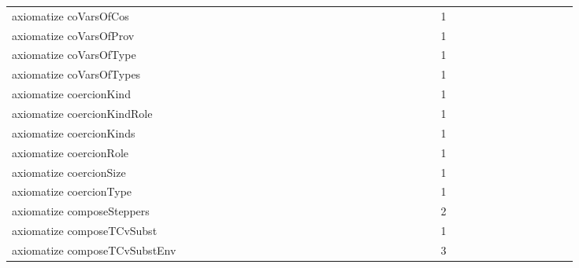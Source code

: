 {\begin{tabular}{l|rrr|rrr|rrr}
axiomatize coVarsOfCos &  &  &  &  &  &  &  &  &  &  &  &  &  &  &  &  &  &  &  &  &  &  &  & 1 &  &  &  &  &  &  &  &  &  &  &  & \\
axiomatize coVarsOfProv &  &  &  &  &  &  &  &  &  &  &  &  &  &  &  &  &  &  &  &  &  &  &  & 1 &  &  &  &  &  &  &  &  &  &  &  & \\
axiomatize coVarsOfType &  &  &  &  &  &  &  &  &  &  &  &  &  &  &  &  &  &  &  &  &  &  &  & 1 &  &  &  &  &  &  &  &  &  &  &  & \\
axiomatize coVarsOfTypes &  &  &  &  &  &  &  &  &  &  &  &  &  &  &  &  &  &  &  &  &  &  &  & 1 &  &  &  &  &  &  &  &  &  &  &  & \\
axiomatize coercionKind &  &  &  &  &  &  &  &  &  &  &  &  &  &  &  &  &  &  &  &  &  &  &  & 1 &  &  &  &  &  &  &  &  &  &  &  & \\
axiomatize coercionKindRole &  &  &  &  &  &  &  &  &  &  &  &  &  &  &  &  &  &  &  &  &  &  &  & 1 &  &  &  &  &  &  &  &  &  &  &  & \\
axiomatize coercionKinds &  &  &  &  &  &  &  &  &  &  &  &  &  &  &  &  &  &  &  &  &  &  &  & 1 &  &  &  &  &  &  &  &  &  &  &  & \\
axiomatize coercionRole &  &  &  &  &  &  &  &  &  &  &  &  &  &  &  &  &  &  &  &  &  &  &  & 1 &  &  &  &  &  &  &  &  &  &  &  & \\
axiomatize coercionSize &  &  &  &  &  &  &  &  &  &  &  &  &  &  &  &  &  &  &  &  &  &  &  & 1 &  &  &  &  &  &  &  &  &  &  &  & \\
axiomatize coercionType &  &  &  &  &  &  &  &  &  &  &  &  &  &  &  &  &  &  &  &  &  &  &  & 1 &  &  &  &  &  &  &  &  &  &  &  & \\
axiomatize composeSteppers &  &  &  &  &  &  &  &  &  &  &  &  &  &  &  &  &  &  &  &  &  &  &  & 2 &  &  &  &  &  &  &  &  &  &  &  & \\
axiomatize composeTCvSubst &  &  &  &  &  &  &  &  &  &  &  &  &  &  &  &  &  &  &  &  &  &  &  & 1 &  &  &  &  &  &  &  &  &  &  &  & \\
axiomatize composeTCvSubstEnv &  &  &  &  &  &  &  &  &  &  &  &  &  &  &  &  &  &  &  &  &  &  &  & 3 &  &  &  &  &  &  &  &  &  &  &  & \\

\end{tabular}}
